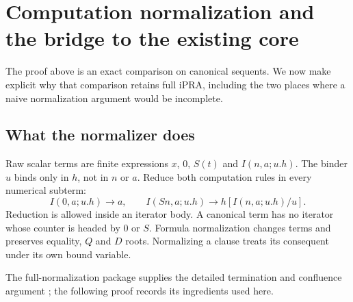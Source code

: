 \documentclass[11pt]{article}
\theoremstyle{definition}
\theoremstyle{remark}
\begin{document}
\section{Computation normalization and the bridge to the existing core}
\label{sec:normal-bridge}

The proof above is an exact comparison on canonical sequents. We now make
explicit why that comparison retains full iPRA, including the two places
where a naive normalization argument would be incomplete.

\subsection{What the normalizer does}

Raw scalar terms are finite expressions $x$, $0$, $S(t)$ and
$I(n,a;u.h)$. The binder $u$ binds only in $h$, not in $n$ or $a$.
Reduce both computation rules in every numerical subterm:
\[
 I(0,a;u.h)\longrightarrow a,\qquad
 I(Sn,a;u.h)\longrightarrow h[I(n,a;u.h)/u].
\]
Reduction is allowed inside an iterator body. A canonical term has no
iterator whose counter is headed by $0$ or $S$. Formula normalization
changes terms and preserves equality, $Q$ and $D$ roots.
Normalizing a clause treats its consequent under its own bound variable.

The full-normalization package supplies the detailed termination and
confluence argument \cite{normal}; the following proof records its
ingredients used here.
\end{document}
